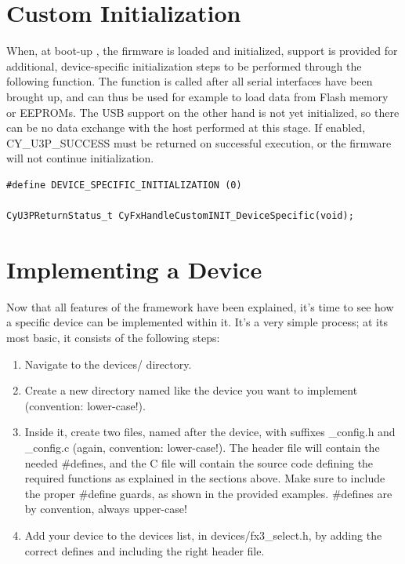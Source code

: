 \documentclass[a4paper,12pt]{report}
\begin{document}
\section{Custom Initialization} \label{sec:custom_initialization}

When, at boot-up \cite{AN76405}, the firmware is loaded and initialized, support is provided for additional, device-specific initialization steps to be performed through the following function. The function is called after all serial interfaces have been brought up, and can thus be used for example to load data from Flash memory or EEPROMs. The USB support on the other hand is not yet initialized, so there can be no data exchange with the host performed at this stage. If enabled, CY\_U3P\_SUCCESS must be returned on successful execution, or the firmware will not continue initialization.

\begin{lstlisting}
#define DEVICE_SPECIFIC_INITIALIZATION (0)

CyU3PReturnStatus_t CyFxHandleCustomINIT_DeviceSpecific(void);
\end{lstlisting}

\section{Implementing a Device} \label{sec:implementing_device}

Now that all features of the framework have been explained, it's time to see how a specific device can be implemented within it. It's a very simple process; at its most basic, it consists of the following steps:

\begin{enumerate}
\item Navigate to the devices/ directory.
\item Create a new directory named like the device you want to implement (convention: lower-case!).
\item Inside it, create two files, named after the device, with suffixes \_config.h and \_config.c (again, convention: lower-case!). The header file will contain the needed \#defines, and the C file will contain the source code defining the required functions as explained in the sections above. Make sure to include the proper \#define guards, as shown in the provided examples. \#defines are by convention, always upper-case!
\item Add your device to the devices list, in devices/fx3\_select.h, by adding the correct defines and including the right header file.
\end{enumerate}
\end{document}
